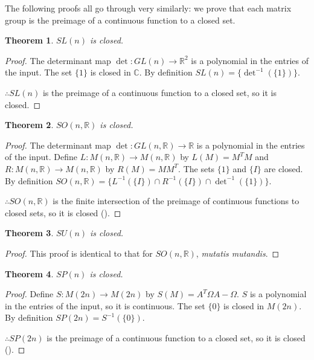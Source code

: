 \documentclass[12pt]{article}
\newcommand{\C}{\mathbb{C}}
\newcommand{\R}{\mathbb{R}}
\newcommand{\son}{SO (n, \R)}
\newcommand{\Om}{\Omega}
\newtheorem{them}{Theorem}[section]
\theoremstyle{definition}
\theoremstyle{definition}
\theoremstyle{definition}
\theoremstyle{definition}
\theoremstyle{definition}
\theoremstyle{definition}
\theoremstyle{definition}
\theoremstyle{definition}
\begin{document}
\par{The following proofs all go through very
similarly: we prove that each matrix group is the
preimage of a continuous function to a closed
set.}

\begin{them}$SL(n)$ is closed.\end{them}
\begin{proof}
    \par{The determinant map $\det: GL(n) \to
    \R^2$ is a polynomial in the entries of the
    input. The set $\{1\}$ is closed in $\C$. By
    definition $SL(n) = \{\det^{-1}(\{1\})\}$.}
    \par{$\therefore SL(n)$ is the preimage of a
    continuous function to a closed set, so it is
    closed.}
\end{proof}
    
\begin{them}$\son$ is closed.\end{them}
\begin{proof}
    \par{The determinant map $\det: GL(n, \R) \to
    \R$ is a polynomial in the entries of the
    input. Define $L: M(n, \R) \to M(n, \R)$ by
    $L(M) = M^T M$ and $R: M(n, \R) \to M(n, \R)$
    by $R(M) = MM^T$. The sets $\{1\}$ and $\{I\}$
    are closed. By definition $\son =
    \{L^{-1}(\{I\}) \cap R^{-1}(\{I\}) \cap
    \det^{-1}(\{1\})\}$.} \par{$\therefore \son$
    is the finite intersection of the preimage of
    continuous functions to closed sets, so it is
    closed (\cite{freakish}).}
\end{proof}

\begin{them}$SU(n)$ is closed.\end{them}
\begin{proof}
    This proof is identical to that for $\son$,
    \textit{mutatis mutandis}.
\end{proof}

\begin{them}$SP(n)$ is closed.\end{them}
\begin{proof}
    \par{Define $S: M(2n) \to M(2n)$ by $S(M) =
    A^T \Om A - \Om$. $S$ is a polynomial in the
    entries of the input, so it is continuous. The
    set $\{0\}$ is closed in $M(2n)$. By
    definition $SP(2n) = S^{-1}(\{0\})$.}
    \par{$\therefore SP(2n)$ is the preimage of a
    continuous function to a closed set, so it is
    closed (\cite{Heuber}).}
\end{proof}
\end{document}
